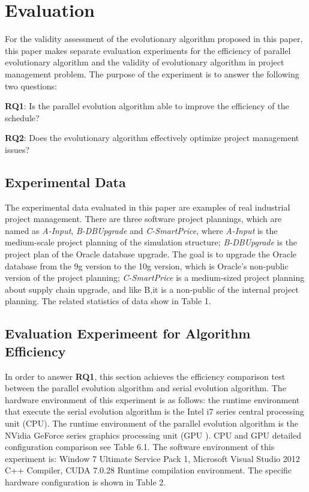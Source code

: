 \section{Evaluation}
%
For the validity assessment of the evolutionary algorithm proposed in
this paper, this paper makes separate evaluation experiments for the
efficiency of parallel evolutionary algorithm and the validity of
evolutionary algorithm in project management problem. The purpose of
the experiment is to answer the following two questions:

\textbf{RQ1}: Is the parallel evolution algorithm able to improve the efficiency of 
the schedule?

\textbf{RQ2}: Does the evolutionary algorithm effectively optimize project management 
issues?

\subsection{Experimental Data}
%
The experimental data evaluated in this paper are examples of real
industrial project management. There are three software project
plannings, which are named as \emph{A-Input}, \emph{B-DBUpgrade} and
\emph{C-SmartPrice}, where \emph{A-Input} is the medium-scale project
planning of the simulation structure; \emph{B-DBUpgrade} is the
project plan of the Oracle database upgrade. The goal is to upgrade
the Oracle database from the 9g version to the 10g version, which is
Oracle's non-public version of the project planning;
\emph{C-SmartPrice} is a medium-sized project planning about supply chain upgrade, 
and like B,it is a non-public of the internal project
planning\cite{ren}. The related statistics of data show in Table 1.


\subsection{Evaluation Experimeent for Algorithm Efficiency}
%

In order to answer \textbf{RQ1}, this section achieves the efficiency
comparison test between the parallel evolution algorithm and serial
evolution algorithm. The hardware environment of this experiment is as
follows: the runtime environment that execute the serial evolution
algorithm is the Intel i7 series central processing unit (CPU). The
runtime environment of the parallel evolution algorithm is the NVidia
GeForce series graphics processing unit (GPU ). CPU and GPU detailed
configuration comparison see Table 6.1. The software environment of
this experiment is: Window 7 Ultimate Service Pack 1, Microsoft Visual
Studio 2012 C++ Compiler, CUDA 7.0.28 Runtime compilation
environment. The specific hardware configuration is shown in Table 2.

